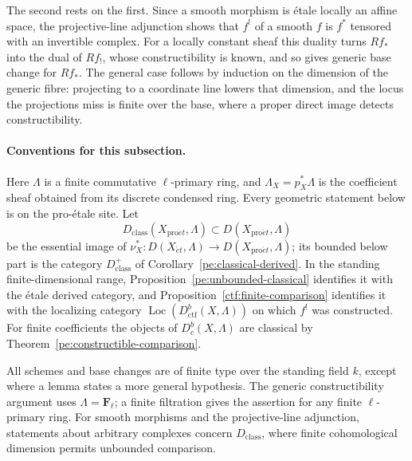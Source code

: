 \documentclass[11pt,a4paper]{article}
\numberwithin{equation}{section}
\theoremstyle{definition}
\theoremstyle{remark}
\newcommand{\Dbc}{D^b_c}
\newcommand{\Loc}{\operatorname{Loc}}
\newcommand{\Fell}{\mathbf F_\ell}
\newcommand{\et}{\acute{e}t}
\newcommand{\proet}{\mathrm{pro}\acute{e}t}
\newcommand{\Dctf}{D^b_{\mathrm{ctf}}}
\begin{document}
The second rests on the first. Since a smooth morphism is \'etale
locally an affine space, the projective-line adjunction shows that
\(f^!\) of a smooth \(f\) is \(f^*\) tensored with an invertible
complex. For a locally constant sheaf this duality turns \(Rf_*\) into
the dual of \(Rf_!\), whose constructibility is known, and so gives
generic base change for \(Rf_*\). The general case follows by induction
on the dimension of the generic fibre: projecting to a coordinate line
lowers that dimension, and the locus the projections miss is finite over
the base, where a proper direct image detects constructibility.

\paragraph*{Conventions for this subsection.}
Here $\Lambda$ is a finite commutative $\ell$-primary ring, and
$\Lambda_X=p_X^*\Lambda$ is the coefficient sheaf obtained from its
discrete condensed ring. Every geometric statement below is on the
pro-\'etale site. Let
\[
 D_{\mathrm{class}}(X_{\proet},\Lambda)\subset D(X_{\proet},\Lambda)
\]
be the essential image of $\nu_X^*:D(X_{\et},\Lambda)\to
D(X_{\proet},\Lambda)$; its bounded below part is the category
$D^+_{\mathrm{class}}$ of Corollary~\ref{pe:classical-derived}. In the
standing finite-dimensional range, Proposition~\ref{pe:unbounded-classical}
identifies it with the \'etale derived category, and
Proposition~\ref{ctf:finite-comparison} identifies it with the
localizing category $\Loc(\Dctf(X,\Lambda))$ on which $f^!$ was constructed. For finite
coefficients the objects of $\Dbc(X,\Lambda)$ are
classical by Theorem~\ref{pe:constructible-comparison}.

All schemes and base changes are of finite type over the standing field
$k$, except where a lemma states a more general hypothesis. The generic constructibility argument uses $\Lambda=\Fell$;
a finite filtration gives the assertion for any finite $\ell$-primary
ring. For smooth morphisms and the projective-line adjunction,
statements about arbitrary complexes concern $D_{\mathrm{class}}$, where
finite cohomological dimension permits unbounded comparison.
\end{document}
